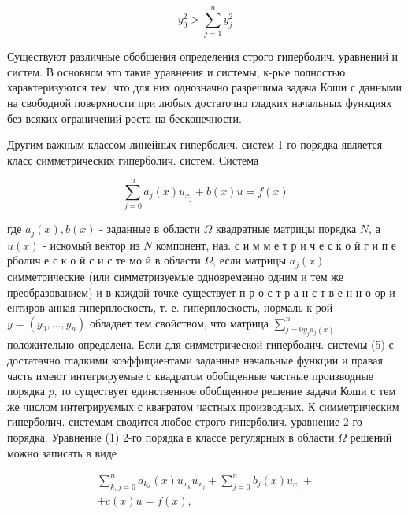 \documentclass[10pt]{article}
\begin{document}
\[

y_{0}^{2}>\sum_{j=1}^{n} y_{j}^{2}

\]



Существуют различные обобщения определения строго гиперболич. уравнений и систем. В основном это такие уравнения и системы, к-рые полностью характеризуются тем, что для них однозначно разрешима задача Коши с данными на свободной поверхности при любых достаточно гладких начальных функциях без всяких ограничений роста на бесконечности.



Другим важным классом линейных гиперболич. систем 1-го порядка является класс симметрических гиперболич. систем. Система



\[

\sum_{j=0}^{n} a_{j}(x) u_{x_{j}}+b(x) u=f(x)

\]



где $a_{j}(x), b(x)$ - заданные в области $\Omega$ квадратные матрицы порядка $N$, а $u(x)$ - искомый вектор из $N$ компонент, наз. с и м м е т р и ч е с к о й г и п е рболич е с к о й с и с те мо й в области $\Omega$, если матрицы $a_{j}(x)$ симметрические (или симметризуемые одновременно одним и тем же преобразованием) и в каждой точке существует п р о с т р а н с т в е н н о ор и ентиров анная гиперплоскость, т. е. гиперплоскость, нормаль к-рой $y=\left(y_{0}, \ldots, y_{n}\right)$ обладает тем свойством, что матрица $\sum_{j=0 y_{j} a_{j}(x)}^{n}$ положительно определена. Если для симметрической гиперболич. системы (5) с достатөчно гладкими коэффициентами заданные начальные функции и правая часть имеют интегрируемые с квадратом обобщенные частные производные порядка $p$, то существует единственное обобщенное решение задачи Коши с тем же числом интегрируемых с квағратом частных производных. К симметрическим гиперболич. системам сводится любое строго гиперболич. уравнение 2-го порядка. Уравнение (1) 2-го порядка в классе регулярных в области $\Omega$ решений можно записать в виде



\[

\begin{gathered}

\sum_{k, j=0}^{n} a_{k j}(x) u_{x_{k}} u_{x_{j}}+\sum_{j=0}^{n} b_{j}(x) u_{x_{j}}+ \\

+c(x) u=f(x),

\end{gathered}

\]
\end{document}

